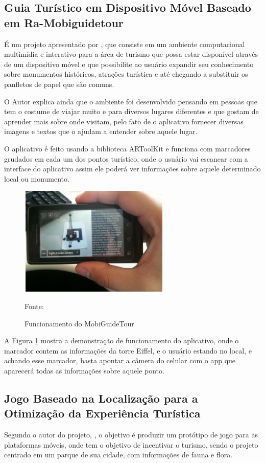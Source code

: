 	\subsection{Guia Turístico em Dispositivo Móvel Baseado em Ra-Mobiguidetour}
		É um projeto apresentado por , que consiste em um ambiente computacional multimídia e interativo para a área de turismo que possa estar disponível através de um dispositivo móvel e que possibilite ao usuário expandir seu conhecimento sobre monumentos históricos, atrações turística e até chegando a substituir os panfletos de papel que são comuns.
		
		O Autor explica ainda que o ambiente foi desenvolvido pensando em pessoas que tem o costume de viajar muito e para diversos lugares diferentes e que gostam de aprender mais sobre onde visitam, pelo fato de o aplicativo fornecer diversas imagens e textos que o ajudam a entender sobre aquele lugar.
		
		O aplicativo é feito usando a biblioteca ARToolKit e funciona com marcadores grudados em cada um dos pontos turístico, onde o usuário vai escanear com a interface do aplicativo assim ele poderá ver informações sobre aquele determinado local ou monumento.  
		
		\begin{figure}[H]
			\centering
			\includegraphics[scale=1]{imagens/MobiGuideTour}
			\caption{Funcionamento do MobiGuideTour}
			Fonte: 
			\label{fig:mobiguide}
		\end{figure}
		
		A Figura \ref{fig:mobiguide} mostra a demonstração de funcionamento do aplicativo, onde o marcador contem as informações da torre Eiffel, e o usuário estando no local, e achando esse marcador, basta apontar a câmera do celular com o app que aparecerá todas as informações sobre aquele ponto.
		
	\subsection{Jogo Baseado na Localização para a Otimização da Experiência Turística}
		Segundo o autor do projeto, , o objetivo é produzir um protótipo de jogo para as plataformas móveis, onde tem o objetivo de incentivar o turismo, sendo o projeto centrado em um parque de sua cidade, com informações de fauna e flora.
		
